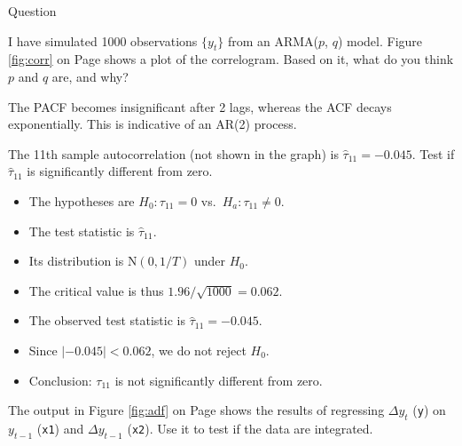 \documentclass[12pt, a4paper]{article}
\begin{document}
\begin{exam}{Question \thequestion}
\begin{instructions}

\end{instructions}
\begin{problem}[6]
I have simulated 1000 observations $\{y_t\}$ from an ARMA($p$, $q$) model. Figure \ref{fig:corr} on Page \pageref{fig:corr} shows a plot of the correlogram. Based on it, what do you think $p$ and $q$ are, and why?
\begin{solution}[10cm]
The PACF becomes insignificant after 2 lags, whereas the ACF decays exponentially. This is indicative of an AR(2) process.
\end{solution}
\end{problem}
\begin{problem}[6]
The 11th sample autocorrelation (not shown in the graph) is $\hat{\tau}_{11} =-0.045$. Test if $\hat{\tau}_{11}$ is significantly different from zero.
\begin{solution}[10cm]

\begin{itemize}
\item The hypotheses are $H_0: \tau_{11} = 0$ vs.\ $H_a: \tau_{11}\neq 0$.
\item The test statistic is $\hat{\tau}_{11}$.
\item Its distribution is $\mathrm{N}(0, 1/T)$ under $H_0$.
\item The critical value is thus $1.96/\sqrt{1000} = 0.062$.
\item The observed test statistic is $\hat{\tau}_{11} =-0.045$.
\item Since $|-0.045| < 0.062$, we do not reject $H_0$.
\item Conclusion: $\tau_{11}$ is not significantly different from zero.
\end{itemize}
\end{solution}


\end{problem}
\begin{problem}[6]
The output in Figure \ref{fig:adf} on Page \pageref{fig:adf} shows the results of regressing $\Delta y_t$ (\texttt{y}) on $y_{t-1}$ (\texttt{x1}) and $\Delta y_{t-1}$ (\texttt{x2}). Use it to test if the data are integrated.
\begin{solution}[10cm]


\end{solution}
\end{problem}
\end{exam}
\end{document}
